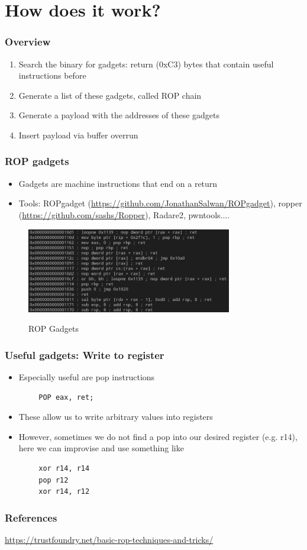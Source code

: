 \documentclass[11pt]{beamer}
\begin{document}
\section{How does it work?}
\begin{frame}
    \frametitle{Overview}
    \begin{enumerate}
        \item Search the binary for gadgets: return (0xC3) bytes that contain useful instructions before
        \item Generate a list of these gadgets, called ROP chain
        \item Generate a payload with the addresses of these gadgets
        \item Insert payload via buffer overrun
    \end{enumerate}
\end{frame}
\begin{frame}
    \frametitle{ROP gadgets}
    \begin{itemize}
        \item Gadgets are machine instructions that end on a return
        \item Tools: ROPgadget (\url{https://github.com/JonathanSalwan/ROPgadget}), ropper (\url{https://github.com/sashs/Ropper}), Radare2, pwntools....
    \end{itemize}
    \begin{figure}[h]
        \caption{ROP Gadgets}
        \centering
        \includegraphics[width=0.8\textwidth]{gadget.png}\label{gadget}
    \end{figure}

\end{frame}

\begin{frame}[fragile]
    \frametitle{Useful gadgets: Write to register}
    \begin{itemize}
        \item Especially useful are pop instructions
    \end{itemize}
    \begin{Verbatim}
        POP eax, ret;
    \end{Verbatim}
    \begin{itemize}
        \item These allow us to write arbitrary values into registers
        \item However, sometimes we do not find a pop into our desired register (e.g. r14), here we can improvise and use something like
    \end{itemize}
    \begin{Verbatim}
        xor r14, r14
        pop r12
        xor r14, r12
    \end{Verbatim}
\end{frame}

\begin{frame}
    \frametitle{References}
    \url{https://trustfoundry.net/basic-rop-techniques-and-tricks/}
    
\end{frame}
\end{document}

